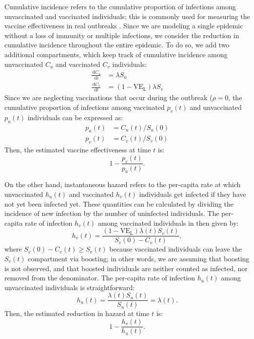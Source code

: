 \documentclass[12pt]{article}
\newcommand{\dd}[1]{\ensuremath{\, \mathrm{d}#1}}
\newcommand{\VE}{\ensuremath{\mathrm{VE}}}
\newcommand{\VEL}{\ensuremath{\VE_{\mathrm{L}}}}
\begin{document}
Cumulative incidence refers to the cumulative proportion of infections among unvaccinated and vaccinated individuals; 
this is commonly used for measuring the vaccine effectiveness in real outbreaks \citep{farrington1993estimation}.
Since we are modeling a single epidemic without a loss of immunity or multiple infections, we consider the reduction in cumulative incidence throughout the entire epidemic.
To do so, we add two additional compartments, which keep track of cumulative incidence among unvaccinated $C_u$ and vaccinated $C_v$ individuals:
\begin{align}
\frac{\dd C_u}{\dd t} &= \lambda S_u\\
\frac{\dd C_v}{\dd t} &= (1-\VEL) \lambda S_v
\end{align}
Since we are neglecting vaccinations that occur during the outbreak ($\rho=0$, the cumulative proportion of infections among vaccinated $p_v(t)$ and unvaccinated $p_u(t)$ individuals can be expressed as:
\begin{align}
p_u(t) &= C_u(t)/S_u(0)\\
p_v(t) &= C_v(t)/S_v(0)
\end{align}
Then, the estimated vaccine effectiveness at time $t$ is:
\begin{equation}
1 - \frac{p_v(t)}{p_u(t)}.
\end{equation}

On the other hand, instantaneous hazard refers to the per-capita rate at which unvaccinated $h_u(t)$ and vaccinated $h_v(t)$ individuals get infected if they have not yet been infected yet.
These quantities can be calculated by dividing the incidence of new infection by the number of uninfected individuals.
The per-capita rate of infection $h_v(t)$ among vaccinated individuals in then given by:
\begin{equation}
h_v(t) = \frac{(1-\VEL) \lambda(t) S_v(t)}{S_v(0) - C_v(t)},
\end{equation}
where $S_v(0) - C_v(t) \geq S_v(t)$ because vaccinated individuals can leave the $S_v(t)$ compartment via boosting;
in other words, we are assuming that boosting is not observed, and that boosted individuals are neither counted as infected, nor removed from the denominator.
The per-capita rate of infection $h_u(t)$ among unvaccinated individuals is straightforward: 
\begin{equation}
h_u(t) = \frac{\lambda(t) S_u(t)}{S_u(t)} = \lambda(t).
\end{equation}
Then, the estimated reduction in hazard at time $t$ is:
\begin{equation}
1 - \frac{h_v(t)}{h_u(t)}.
\end{equation}
\end{document}
